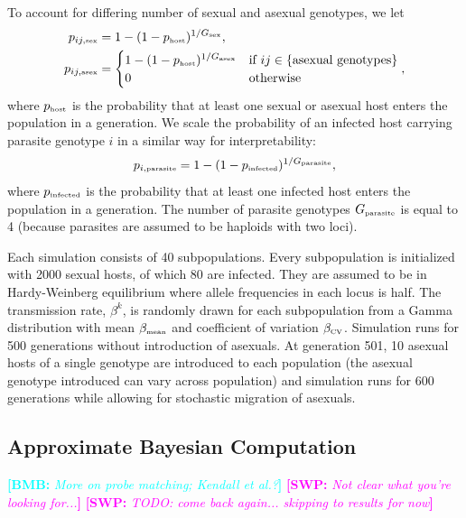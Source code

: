 \documentclass{article}\usepackage[]{graphicx}\usepackage[]{color}
\newcommand{\comment}[3]{\textcolor{#1}{\textbf{[#2: }\textit{#3}\textbf{]}}}
\newcommand{\bmb}[1]{\comment{cyan}{BMB}{#1}}
\newcommand{\swp}[1]{\comment{magenta}{SWP}{#1}}
\begin{document}
To account for differing number of sexual and asexual genotypes, we let 
\begin{equation}
\begin{aligned}
p_{ij, \textrm{\tiny sex}} &= 1-(1-p_{\textrm{\tiny host}})^{1/G_\textrm{\tiny sex}},\\
p_{ij, \textrm{\tiny asex}} &=
\begin{cases}
1-(1-p_{\textrm{\tiny host}})^{1/G_\textrm{\tiny asex}} & \text{if } ij \in \{\text{asexual genotypes}\} \\
0 & \text{otherwise}
\end{cases},
\end{aligned}
\end{equation}
where $p_{\textrm{\tiny host}}$ is the probability that at least one sexual or asexual host enters the population in a generation. We scale the probability of an infected host carrying parasite genotype $i$ in a similar way for interpretability:
\begin{equation}
p_{i, \textrm{\tiny parasite}} = 1 - (1-p_{\textrm{\tiny infected}})^{1/G_\textrm{\tiny parasite}},
\end{equation}
where $p_{\textrm{\tiny infected}}$ is the probability that at least one infected host enters the population in a generation.
The number of parasite genotypes $G_\textrm{\tiny parasite}$ is equal to 4 (because parasites are assumed to be haploids with two loci).

Each simulation consists of 40 subpopulations. Every subpopulation is initialized with 2000 sexual hosts, of which 80 are infected. 
They are assumed to be in Hardy-Weinberg equilibrium where allele frequencies in each locus is half. 
The transmission rate, $\beta^k$, is randomly drawn for each subpopulation from a Gamma distribution with mean $\beta_{\textrm{\tiny mean}}$ and coefficient of variation $\beta_{\textrm{\tiny CV}}$. 
Simulation runs for 500 generations without introduction of asexuals. At generation 501, 10 asexual hosts of a single genotype are introduced to each population (the asexual genotype introduced can vary across population) and simulation runs for 600 generations while allowing for stochastic migration of asexuals.

\subsection{Approximate Bayesian Computation}

\bmb{More on probe matching; Kendall et al.?}
\swp{Not clear what you're looking for...}
\swp{TODO: come back again... skipping to results for now}
\end{document}

